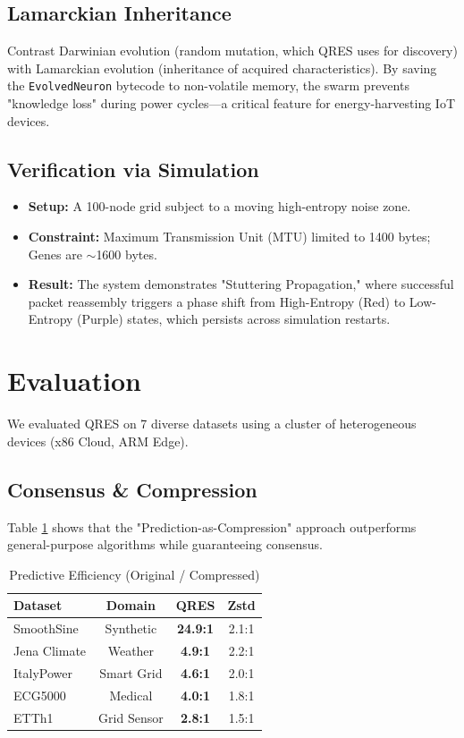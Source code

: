 \documentclass[10pt, twocolumn]{article}
\begin{document}
\subsection{Lamarckian Inheritance}
Contrast Darwinian evolution (random mutation, which QRES uses for discovery) with Lamarckian evolution (inheritance of acquired characteristics). By saving the \texttt{EvolvedNeuron} bytecode to non-volatile memory, the swarm prevents "knowledge loss" during power cycles—a critical feature for energy-harvesting IoT devices.

\subsection{Verification via Simulation}
\begin{itemize}
    \item \textbf{Setup:} A 100-node grid subject to a moving high-entropy noise zone.
    \item \textbf{Constraint:} Maximum Transmission Unit (MTU) limited to 1400 bytes; Genes are $\sim$1600 bytes.
    \item \textbf{Result:} The system demonstrates "Stuttering Propagation," where successful packet reassembly triggers a phase shift from High-Entropy (Red) to Low-Entropy (Purple) states, which persists across simulation restarts.
\end{itemize}

\section{Evaluation}
We evaluated QRES on 7 diverse datasets using a cluster of heterogeneous devices (x86 Cloud, ARM Edge).

\subsection{Consensus \& Compression}
Table \ref{tab:compression} shows that the "Prediction-as-Compression" approach outperforms general-purpose algorithms while guaranteeing consensus.

\begin{table}[h]
\centering
\caption{Predictive Efficiency (Original / Compressed)}
\label{tab:compression}
\begin{tabular}{lccc}
\toprule
Dataset & Domain & QRES & Zstd \\
\midrule
SmoothSine & Synthetic & \textbf{24.9:1} & 2.1:1 \\
Jena Climate & Weather & \textbf{4.9:1} & 2.2:1 \\
ItalyPower & Smart Grid & \textbf{4.6:1} & 2.0:1 \\
ECG5000 & Medical & \textbf{4.0:1} & 1.8:1 \\
ETTh1 & Grid Sensor & \textbf{2.8:1} & 1.5:1 \\
\bottomrule
\end{tabular}
\end{table}
\end{document}
